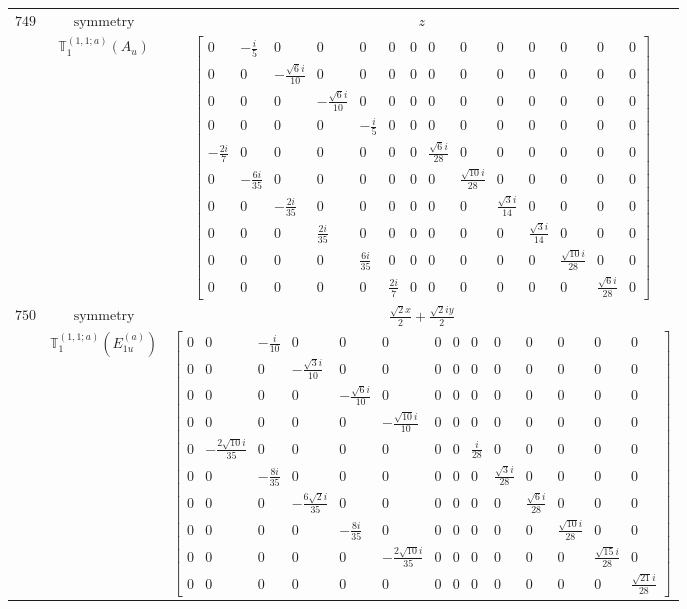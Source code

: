 \documentclass[fleqn,8pt,landscape]{jsarticle}
\begin{document}
\begin{longtable}{ccc}
$ 749 $ & $ \text{symmetry} $ & $ z $ \\
$  $ & $ \mathbb{T}_{1}^{(1,1;a)}(A_{u}) $ & $ \begin{bmatrix} 0 & - \frac{i}{5} & 0 & 0 & 0 & 0 & 0 & 0 & 0 & 0 & 0 & 0 & 0 & 0 \\ 0 & 0 & - \frac{\sqrt{6} i}{10} & 0 & 0 & 0 & 0 & 0 & 0 & 0 & 0 & 0 & 0 & 0 \\ 0 & 0 & 0 & - \frac{\sqrt{6} i}{10} & 0 & 0 & 0 & 0 & 0 & 0 & 0 & 0 & 0 & 0 \\ 0 & 0 & 0 & 0 & - \frac{i}{5} & 0 & 0 & 0 & 0 & 0 & 0 & 0 & 0 & 0 \\ - \frac{2 i}{7} & 0 & 0 & 0 & 0 & 0 & 0 & \frac{\sqrt{6} i}{28} & 0 & 0 & 0 & 0 & 0 & 0 \\ 0 & - \frac{6 i}{35} & 0 & 0 & 0 & 0 & 0 & 0 & \frac{\sqrt{10} i}{28} & 0 & 0 & 0 & 0 & 0 \\ 0 & 0 & - \frac{2 i}{35} & 0 & 0 & 0 & 0 & 0 & 0 & \frac{\sqrt{3} i}{14} & 0 & 0 & 0 & 0 \\ 0 & 0 & 0 & \frac{2 i}{35} & 0 & 0 & 0 & 0 & 0 & 0 & \frac{\sqrt{3} i}{14} & 0 & 0 & 0 \\ 0 & 0 & 0 & 0 & \frac{6 i}{35} & 0 & 0 & 0 & 0 & 0 & 0 & \frac{\sqrt{10} i}{28} & 0 & 0 \\ 0 & 0 & 0 & 0 & 0 & \frac{2 i}{7} & 0 & 0 & 0 & 0 & 0 & 0 & \frac{\sqrt{6} i}{28} & 0 \end{bmatrix} $ \\ \hline
$ 750 $ & $ \text{symmetry} $ & $ \frac{\sqrt{2} x}{2} + \frac{\sqrt{2} i y}{2} $ \\
$  $ & $ \mathbb{T}_{1}^{(1,1;a)}(E_{1u}^{(a)}) $ & $ \begin{bmatrix} 0 & 0 & - \frac{i}{10} & 0 & 0 & 0 & 0 & 0 & 0 & 0 & 0 & 0 & 0 & 0 \\ 0 & 0 & 0 & - \frac{\sqrt{3} i}{10} & 0 & 0 & 0 & 0 & 0 & 0 & 0 & 0 & 0 & 0 \\ 0 & 0 & 0 & 0 & - \frac{\sqrt{6} i}{10} & 0 & 0 & 0 & 0 & 0 & 0 & 0 & 0 & 0 \\ 0 & 0 & 0 & 0 & 0 & - \frac{\sqrt{10} i}{10} & 0 & 0 & 0 & 0 & 0 & 0 & 0 & 0 \\ 0 & - \frac{2 \sqrt{10} i}{35} & 0 & 0 & 0 & 0 & 0 & 0 & \frac{i}{28} & 0 & 0 & 0 & 0 & 0 \\ 0 & 0 & - \frac{8 i}{35} & 0 & 0 & 0 & 0 & 0 & 0 & \frac{\sqrt{3} i}{28} & 0 & 0 & 0 & 0 \\ 0 & 0 & 0 & - \frac{6 \sqrt{2} i}{35} & 0 & 0 & 0 & 0 & 0 & 0 & \frac{\sqrt{6} i}{28} & 0 & 0 & 0 \\ 0 & 0 & 0 & 0 & - \frac{8 i}{35} & 0 & 0 & 0 & 0 & 0 & 0 & \frac{\sqrt{10} i}{28} & 0 & 0 \\ 0 & 0 & 0 & 0 & 0 & - \frac{2 \sqrt{10} i}{35} & 0 & 0 & 0 & 0 & 0 & 0 & \frac{\sqrt{15} i}{28} & 0 \\ 0 & 0 & 0 & 0 & 0 & 0 & 0 & 0 & 0 & 0 & 0 & 0 & 0 & \frac{\sqrt{21} i}{28} \end{bmatrix} $ \\ \hline

\end{longtable}
\end{document}
